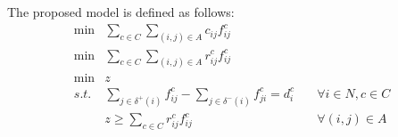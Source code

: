 \documentclass[preprint,12pt]{elsarticle}
\begin{document}
% 
% 
% 
% 




The proposed model is defined as follows:
\begin{eqnarray}
   \min  &  \sum_{c \in C} \sum_{(i,j) \in A} c_{ij} f_{ij}^c & \label{eq:obj1}\\
   \min  &  \sum_{c \in C} \sum_{(i,j) \in A} r_{ij}^c f_{ij}^c & \label{eq:obj2}\\
   \min  & z & \label{eq:obj3}\\
    s.t. & \sum_{j \in \delta^+(i)} f_{ij}^c -  \sum_{j \in \delta^-(i)} f_{ji}^c = d_i^c\quad         & \forall i \in N,  c \in  C \label{eq:flow} \\
    & z \geq \sum_{c \in C} r_{ij}^c f_{ij}^c & \forall (i,j) \in A \\
\end{eqnarray}


\end{document}
